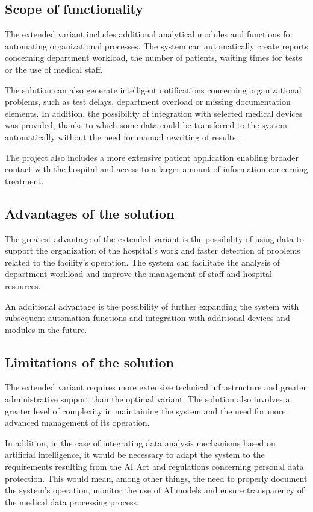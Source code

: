     \subsection{Scope of functionality}
    The extended variant includes additional analytical modules and functions for automating organizational processes. The system can automatically create reports concerning department workload, the number of patients, waiting times for tests or the use of medical staff.

    The solution can also generate intelligent notifications concerning organizational problems, such as test delays, department overload or missing documentation elements. In addition, the possibility of integration with selected medical devices was provided, thanks to which some data could be transferred to the system automatically without the need for manual rewriting of results.

    The project also includes a more extensive patient application enabling broader contact with the hospital and access to a larger amount of information concerning treatment.
    \subsection{Advantages of the solution}
    The greatest advantage of the extended variant is the possibility of using data to support the organization of the hospital's work and faster detection of problems related to the facility's operation. The system can facilitate the analysis of department workload and improve the management of staff and hospital resources.

    An additional advantage is the possibility of further expanding the system with subsequent automation functions and integration with additional devices and modules in the future.
    \subsection{Limitations of the solution}
    The extended variant requires more extensive technical infrastructure and greater administrative support than the optimal variant. The solution also involves a greater level of complexity in maintaining the system and the need for more advanced management of its operation.

    In addition, in the case of integrating data analysis mechanisms based on artificial intelligence, it would be necessary to adapt the system to the requirements resulting from the AI Act and regulations concerning personal data protection. This would mean, among other things, the need to properly document the system's operation, monitor the use of AI models and ensure transparency of the medical data processing process.

